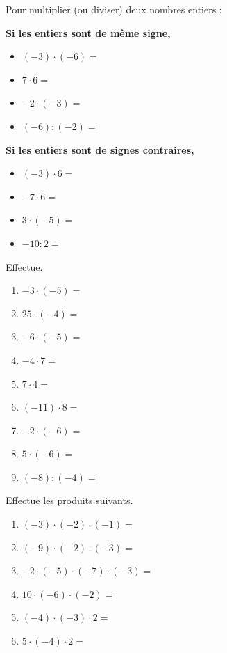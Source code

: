 \documentclass[../../syllabus_1.tex]{subfiles}
\begin{document}
\newpage
Pour multiplier (ou diviser) deux nombres entiers :

\textbf{Si les entiers sont de même signe,} 
\exemples
\begin{itemize}[cols=2, itemsep=1cm, label=]
    \item $(-3)\cdot (-6)=$
    \item $7\cdot 6=$
    \item $-2\cdot (-3)=$
    \item $(-6) : (-2)=$
\end{itemize}
\vspace{1cm}

\textbf{Si les entiers sont de signes contraires,} 
\exemples
\begin{itemize}[cols=2, itemsep=1cm, label=]
    \item $(-3)\cdot 6=$
    \item $-7\cdot 6=$
    \item $3\cdot (-5)=$
    \item $-10 : 2=$
\end{itemize}
\vspace{1cm}

\begin{exercise}
    Effectue.
    \begin{enumerate}[cols=3, itemsep=1cm]
        \item \(-3\cdot (-5)=\)
        \item \(25\cdot (-4)=\)
        \item \(-6\cdot (-5)=\)
        \item \(-4\cdot 7=\)
        \item \(7\cdot 4=\)
        \item \((-11)\cdot 8=\)
        \item \(-2 \cdot (-6)=\)
        \item \(5 \cdot (-6)=\)
        \item \((-8) : (-4)=\)
    \end{enumerate}
    \vspace{1cm}
\end{exercise}

\newpage
\begin{exercise}
    Effectue les produits suivants.
    \begin{enumerate}[cols=2, itemsep=2cm]
        \item \((-3)\cdot (-2) \cdot (-1)=\)
        \item \((-9)\cdot (-2) \cdot (-3)=\)
        \item \(-2\cdot (-5)\cdot (-7) \cdot (-3)=\)
        \item \(10\cdot (-6)\cdot (-2)=\)
        \item \((-4)\cdot (-3)\cdot 2=\)
        \item \(5\cdot (-4)\cdot 2=\)
    \end{enumerate}
    \vspace{2cm}
\end{exercise}
\end{document}
